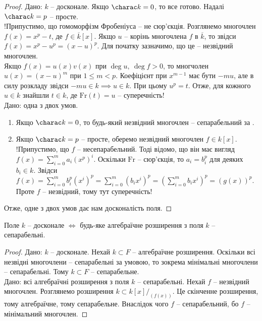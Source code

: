 \documentclass{math_library}
\begin{document}
\begin{proof}
\rightproof Дано: $k$ -- досконале. Якщо $\charac k = 0$, то все готово. Надалі $\charac k = p$ -- просте.\\
!Припустимо, що гомоморфізм Фробеніуса -- не сюр'єкція. Розглянемо многочлен $f(x) = x^p - t$, де $f \in \overline{k}[x]$. Якщо $u$ -- корінь многочлена $f$ в $\overline{k}$, то звідси $f(x) = x^p - u^p = (x-u)^p$. Для початку зазначимо, що це -- незвідний многочлен.\\
Якщо $f(x) = u(x)v(x)$ при $\deg u,\ \deg f > 0$, то многчолен $u(x) = (x-u)^m$ при $1 \leq m < p$. Коефіцієнт при $x^{m-1}$ має бути $-mu$, але в силу розкладу звідси $-mu \in k \implies u \in k$. При цьому $u^p = t$. Отже, для кожного $u \in k$ знайшли $t \in k$, де $\text{Fr}(t) = u$ -- суперечність!
\bigskip \\
\leftproof Дано: одна з двох умов.
\begin{enumerate}[nosep,wide=0pt,label={\arabic*)}]
\item Якщо $\charac k = 0$, то будь-який незвідний многочлен -- сепарабельний за .

\item Якщо $\charac k = p$ -- просте, оберемо незвідний многочлен $f \in k[x]$.\\
!Припустимо, що $f$ -- несепарабельний. Тоді відомо, що він має вигляд $f(x) = \displaystyle\sum_{i=0}^m a_i (x^p)^i$. Оскільки $\text{Fr}$ -- сюр'єкція, то $a_i = b_i^p$ для деяких $b_i \in k$. Звідси \\
$f(x) = \displaystyle\sum_{i=0}^m b_i^p (x^i)^p = \sum_{i=0}^m (b_i x^i)^p = \left( \sum_{i=0}^m b_i x^i \right)^p = (g(x))^p$.\\
Проте $f$ -- незвідний, тому тут суперечність!
\end{enumerate}
Отже, одне з двох умов дає нам досконалість поля.
\end{proof}

\begin{proposition}
Поле $k$ -- досконале $\iff$ будь-яке алгебраїчне розширення з поля $k$ -- сепарабельні.
\end{proposition}

\begin{proof}
\rightproof Дано: $k$ -- досконале. Нехай $k \subset F$ -- алгебраїчне розширення. Оскільки всі незвідні многочлени -- сепарабельні за умовою, то зокрема мінімальні многочлени -- сепарабельні. Тому $k \subset F$ -- сепарабельне.
\bigskip \\
\leftproof Дано: всі алгебраїчні розширення з поля $k$ -- сепарабельні. Нехай $f$ -- незвідний многочлен. Розглянемо розширення $k \subset k[x]/_{(f(x))}$. Це скінченне розширення, тому алгебраїчне, тому сепарабельне. Внаслідок чого $f$ -- сепарабельний, бо $f$ -- мінімальний многочлен.
\end{proof}
\end{document}
